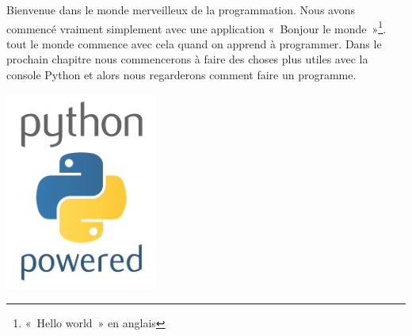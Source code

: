 Bienvenue dans le monde merveilleux de la programmation. Nous avons commencé vraiment simplement avec une 
application «~Bonjour le monde~»\footnote{«~Hello world~» en anglais}. tout le monde commence avec cela quand on apprend à programmer. Dans le prochain chapitre nous commencerons à faire des choses plus utiles avec la console Python et alors nous regarderons comment faire un programme.

 \vfill
\begin{center}
 \includegraphics[width=5cm]{images/python.pdf}
\end{center}
 \vfill

\newpage
\thispagestyle{empty}
